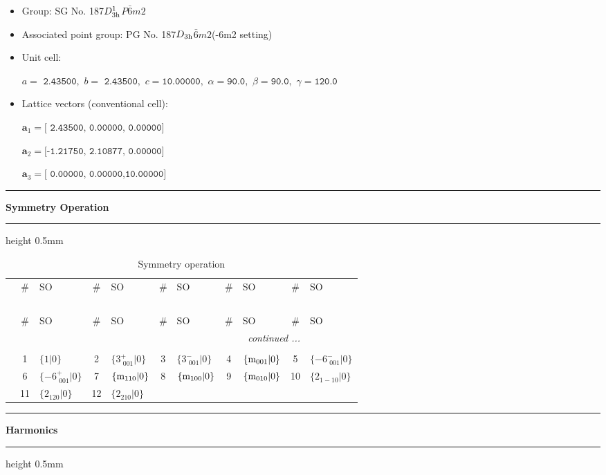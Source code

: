 \documentclass[fleqn,10pt,landscape]{jsarticle}
\begin{document}
\begin{itemize}
\item Group: SG No. 187\quad$D_{\rm 3h}^{1}$\quad$P\bar{6}m2$\quad[ hexagonal ]
\item Associated point group: PG No. 187\quad$D_{\rm 3h}$\quad$\bar{6}m2$\quad(-6m2 setting)\quad[ hexagonal ]
\end{itemize}
\begin{itemize}
\item Unit cell:

\quad $a=\texttt{ 2.43500},\,\, b=\texttt{ 2.43500},\,\, c=\texttt{10.00000},\,\, \alpha=\texttt{90.0},\,\, \beta=\texttt{90.0},\,\, \gamma=\texttt{120.0}$

\item Lattice vectors (conventional cell):

\quad $\bm{a}_1=\texttt{[ 2.43500, 0.00000, 0.00000]}$

\quad $\bm{a}_2=\texttt{[-1.21750, 2.10877, 0.00000]}$

\quad $\bm{a}_3=\texttt{[ 0.00000, 0.00000,10.00000]}$

\end{itemize}
\vspace{5mm}
\noindent \rule[0.5mm]{5mm}{0.5mm}\hspace{3mm}\textbf{Symmetry Operation}\hspace{3mm}\leaders\hrule height 0.5mm\hfill\kern0pt
\vspace{3mm}

\renewcommand{\arraystretch}{1.6}
\begin{longtable}[l]{c|cl|cl|cl|cl|cl}
\captionsetup{justification=raggedright, singlelinecheck=off}
\caption{Symmetry operation}
 \\
 \hline \hline
 & \# & SO & \# & SO & \# & SO & \# & SO & \# & SO \\ \hline \endfirsthead

\multicolumn{10}{l}{\tablename\ \thetable{}} \\
 \hline \hline
 & \# & SO & \# & SO & \# & SO & \# & SO & \# & SO \\ \hline \endhead

 \hline \hline
\multicolumn{10}{r}{\footnotesize\it continued ...} \\ \endfoot

 \hline \hline
\multicolumn{10}{r}{} \\ \endlastfoot

 & 1 & $\{1|0\}$ & 2 & $\{3^{+}_{\,\,001}|0\}$ & 3 & $\{3^{-}_{\,\,001}|0\}$ & 4 & $\{{\rm m}_{001}|0\}$ & 5 & $\{-6^{-}_{\,\,001}|0\}$ \\
& 6 & $\{-6^{+}_{\,\,001}|0\}$ & 7 & $\{{\rm m}_{110}|0\}$ & 8 & $\{{\rm m}_{100}|0\}$ & 9 & $\{{\rm m}_{010}|0\}$ & 10 & $\{2{}_{1-10}|0\}$ \\
& 11 & $\{2{}_{120}|0\}$ & 12 & $\{2{}_{210}|0\}$ &  &  &  &  &  &  \\
\end{longtable}
\vspace{5mm}
\noindent \rule[0.5mm]{5mm}{0.5mm}\hspace{3mm}\textbf{Harmonics}\hspace{3mm}\leaders\hrule height 0.5mm\hfill\kern0pt
\vspace{3mm}
\end{document}
